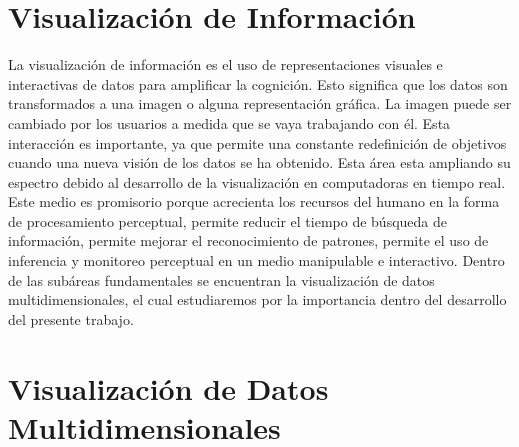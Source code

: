 \section{Visualización de Información}
La visualización de información \cite{card1999readings} es el uso de representaciones visuales e interactivas de datos para amplificar la cognición. Esto significa que los datos son transformados a una imagen o alguna representación gráfica. La imagen puede ser cambiado por los usuarios a medida que se vaya trabajando con él. Esta interacción es importante, ya que permite una constante redefinición de objetivos cuando una nueva visión de los datos se ha obtenido.
Esta área esta ampliando su espectro debido al desarrollo de la visualización en computadoras en tiempo real. Este medio es promisorio porque acrecienta los recursos del humano en la forma de procesamiento perceptual, permite reducir el tiempo de búsqueda de información, permite mejorar el reconocimiento de patrones, permite el uso de  inferencia y monitoreo perceptual en un medio manipulable e interactivo.
Dentro de las subáreas fundamentales se encuentran la visualización de datos multidimensionales, el cual estudiaremos por la importancia dentro del desarrollo del presente trabajo.
\section{Visualización de Datos Multidimensionales}
